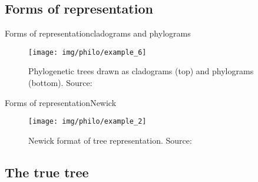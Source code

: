 \documentclass[10pt]{beamer}
\newcommand{\1}{
	\setbeamertemplate{background}{
		\texttt{[image: img/1]}
		\tikz[overlay] \fill[fill opacity=0.75,fill=white] (0,0) rectangle (-\paperwidth,\paperheight);
	}
}
\begin{document}
\subsection{Forms of representation}

\begin{frame}{Forms of representation}{cladograms and phylograms}
	\begin{figure}
		\texttt{[image: img/philo/example\_6]}
		\caption{Phylogenetic trees drawn as cladograms (top) and phylograms (bottom). Source: \cite{xiong2006essential}}			
	\end{figure}
\end{frame}


\begin{frame}{Forms of representation}{Newick}
	\begin{figure}
		\texttt{[image: img/philo/example\_2]}
		\caption{Newick format of tree representation. Source: \cite{xiong2006essential}}			
	\end{figure}
\end{frame}


\subsection{The true tree}
\end{document}

